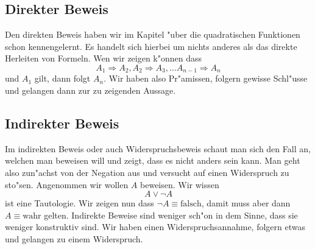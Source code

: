 \subsection{Direkter Beweis}
Den direkten Beweis haben wir im Kapitel "uber die quadratischen Funktionen schon kennengelernt. Es handelt sich hierbei um nichts anderes als das direkte Herleiten von Formeln. Wen wir zeigen k"onnen dass 
\begin{equation*}
A_1 \Rightarrow A_2, A_2 \Rightarrow A_3, \ldots A_{n-1} \Rightarrow A_n
\end{equation*}
und $A_1$ gilt, dann folgt $A_n$. Wir haben also Pr"amissen, folgern gewisse Schl"usse und gelangen dann zur zu zeigenden Aussage.

\subsection{Indirekter Beweis}
Im indirekten Beweis oder auch Widerspruchsbeweis schaut man sich den Fall an, welchen man beweisen will und zeigt, dass es nicht anders sein kann. Man geht also zun"achst von der Negation aus und versucht auf einen Widerspruch zu sto"sen. Angenommen wir wollen $A$ beweisen. Wir wissen
\begin{equation*}
A \lor \neg A
\end{equation*}
ist eine Tautologie. Wir zeigen nun dass $\neg A \equiv \text{falsch}$, damit muss aber dann $A \equiv \text{wahr}$ gelten. Indirekte Beweise sind weniger sch"on in dem Sinne, dass sie weniger konstruktiv sind. Wir haben einen Widerspruchsannahme, folgern etwas und gelangen zu einem Widerspruch.

